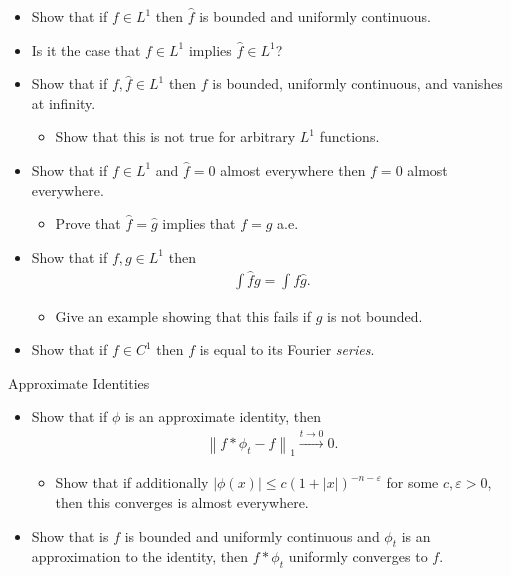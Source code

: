 \begin{itemize}
\tightlist
\item
  Show that if \(f\in L^1\) then \(\widehat{f}\) is bounded and
  uniformly continuous.
\item
  Is it the case that \(f\in L^1\) implies \(\widehat{f}\in L^1\)?
\item
  Show that if \(f, \widehat{f} \in L^1\) then \(f\) is bounded,
  uniformly continuous, and vanishes at infinity.

  \begin{itemize}
  \tightlist
  \item
    Show that this is not true for arbitrary \(L^1\) functions.
  \end{itemize}
\item
  Show that if \(f\in L^1\) and \(\widehat{f} = 0\) almost everywhere
  then \(f = 0\) almost everywhere.

  \begin{itemize}
  \tightlist
  \item
    Prove that \(\widehat{f} = \widehat{g}\) implies that \(f=g\) a.e.
  \end{itemize}
\item
  Show that if \(f, g \in L^1\) then
  \begin{align*}\int \widehat{f} g = \int f\widehat{g}.\end{align*}

  \begin{itemize}
  \tightlist
  \item
    Give an example showing that this fails if \(g\) is not bounded.
  \end{itemize}
\item
  Show that if \(f\in C^1\) then \(f\) is equal to its Fourier
  \emph{series}.
\end{itemize}

Approximate Identities

\begin{itemize}
\tightlist
\item
  Show that if \(\phi\) is an approximate identity, then
  \begin{align*}{\left\lVert {f\ast \phi_t - f} \right\rVert}_1 \overset{t\to 0}\to 0.\end{align*}

  \begin{itemize}
  \tightlist
  \item
    Show that if additionally
    \({\left\lvert {\phi(x)} \right\rvert} \leq c(1 + {\left\lvert {x} \right\rvert})^{-n-{\varepsilon}}\)
    for some \(c,{\varepsilon}>0\), then this converges is almost
    everywhere.
  \end{itemize}
\item
  Show that is \(f\) is bounded and uniformly continuous and \(\phi_t\)
  is an approximation to the identity, then \(f\ast \phi_t\) uniformly
  converges to \(f\).
\end{itemize}

